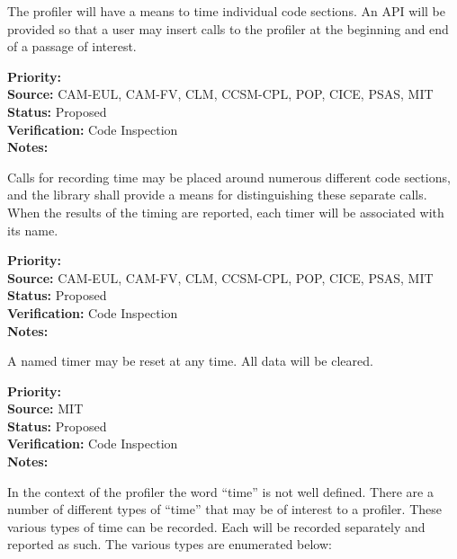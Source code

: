 

The profiler will have a means to time individual code sections.  An API will be 
provided so that a user may insert calls to the profiler at the beginning and
end of a passage of interest.

\begin{reqlist}
{\bf Priority:} \\
{\bf Source:} CAM-EUL, CAM-FV, CLM, CCSM-CPL, POP, CICE, PSAS, MIT \\
{\bf Status:} Proposed \\
{\bf Verification:} Code Inspection \\
{\bf Notes:} 
\end{reqlist}


Calls for recording time may be placed around numerous different code sections, 
and the library shall provide a means for distinguishing these separate calls.  When
the results of the timing are reported, each timer will be associated with its name.

\begin{reqlist}
{\bf Priority:} \\
{\bf Source:} CAM-EUL, CAM-FV, CLM, CCSM-CPL, POP, CICE, PSAS, MIT \\
{\bf Status:} Proposed \\
{\bf Verification:} Code Inspection \\
{\bf Notes:} 
\end{reqlist}


A named timer may be reset at any time.  All data will be cleared.

\begin{reqlist}
{\bf Priority:} \\
{\bf Source:} MIT \\
{\bf Status:} Proposed \\
{\bf Verification:} Code Inspection \\
{\bf Notes:} 
\end{reqlist}


In the context of the profiler the word ``time'' is not well defined.  There are
a number of different types of ``time'' that may be of interest to a profiler.
These various types of time can be recorded.  Each will be recorded separately and reported
as such.  The various types are enumerated below:

